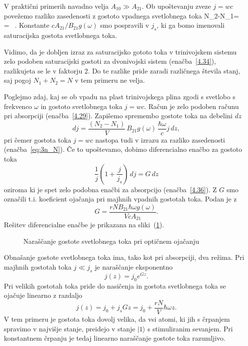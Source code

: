 V praktični primerih navadno velja $A_{10}\gg A_{21}$. Ob upoštevanju zveze $j=wc$ povežemo
razliko zasedenosti z gostoto vpadnega svetlobnega toka
\beq
N_{2}-N_{1}= \,  = 
 \, .
\label{eq:3n_N}
\eeq
Konstante $c A_{21}/B_{21}g(\omega)$ smo pospravili v $j_s$, ki ga bomo imenovali 
saturacijska gostota svetlobnega toka. 
\begin{remark}
 Vidimo, da je dobljen izraz za saturacijsko gototo toka v trinivojskem sistemu zelo 
 podoben saturacijski gostoti za dvonivojski sistem (enačba~\ref{4.34}), razlikujeta se le
v faktorju 2. Do te razlike pride zaradi različnega števila stanj, saj pogoj $N_{1}+N_{2}=N$
v tem primeru ne velja. 
\end{remark}

Poglejmo zdaj, kaj se ob vpadu na plast trinivojskega plina zgodi s svetlobo s frekvenco $\omega$ in 
gostoto svetlobnega toka $j=wc$. Račun je zelo podoben računu pri absorpciji (enačba~\ref{4.29}). Zapišemo
spremembo gostote toka na debelini $dz$ 
\begin{equation}
dj=\frac{(N_{2}-N_{1})}{V}\, B_{21}g(\omega)\, \frac{\hbar\omega}{c}j\, dz,
\label{eq:dj}
\end{equation}
pri čemer gostota toka $j = wc$ nastopa tudi v izrazu za razliko zasedenosti (enačba~\ref{eq:3n_N}). 
Če to upoštevamo, dobimo diferencialno enačbo za gostoto toka
\begin{equation}
\frac{1}{j}\left(1+\frac{j}{j_{s}}\right)\, dj=G\, dz
\label{4.43}
\end{equation}
oziroma
ki je spet zelo podobna enačbi za absorpcijo (enačba~\ref{4.36}).
Z $G$ smo označili t.i. koeficient ojačanja pri majhnih vpadnih gostotah
toka. Podan je z 
\begin{equation}
G=\frac{rNB_{21}\hbar\omega g(\omega)}{VcA_{21}}.\label{4.44}
\end{equation}
Rešitev diferencialne enačbe je prikazana na sliki~(\ref{fig:ojacanje}). 
\begin{figure}[h]
\centering
\def\svgwidth{90truemm} 

\caption{Naraščanje gostote svetlobnega toka pri optičnem ojačanju}
\label{fig:ojacanje}
\end{figure}

Obnašanje gostote svetlobnega toka ima, tako kot pri absorpciji, dva režima. 
Pri majhnih gostotah toka $j\ll j_{s}$ je naraščanje eksponentno 
\begin{equation}
j(z)=j_{0}e^{Gz}.
\label{4.45}
\end{equation}
Pri velikih gostotah toka pride do nasičenja in gostota svetlobnega
toka se ojačuje linearno z razdaljo
\begin{equation}
j(z)=j_{0}+j_{s}Gz=j_{0}+\frac{rN}{V}\hbar \omega z.
\label{4.46}
\end{equation}
 V tem primeru je gostota toka dovolj velika, da vsi atomi, ki jih
s črpanjem spravimo v najvišje stanje, preidejo v stanje $|1\rangle$
s stimuliranim sevanjem. Pri konstantnem črpanju je tedaj 
linearno naraščanje gostote toka razumljivo. 

